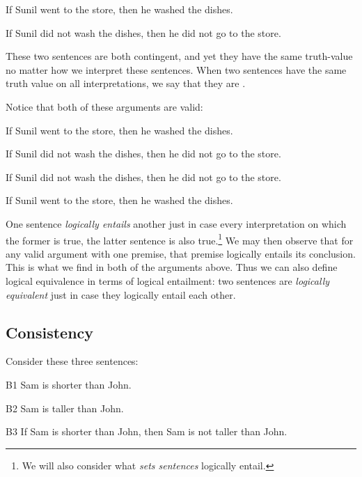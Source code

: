 \begin{earg}
  \item[] If Sunil went to the store, then he washed the dishes.
  \item[] If Sunil did not wash the dishes, then he did not go to the store.
\end{earg}

These two sentences are both contingent, and yet they have the same truth-value no matter how we interpret these sentences.
When two sentences have the same truth value on all interpretations, we say that they are .

Notice that both of these arguments are valid:

\begin{earg}
  \item[] If Sunil went to the store, then he washed the dishes.
  \item[\therefore] If Sunil did not wash the dishes, then he did not go to the store.
\end{earg}

\begin{earg}
  \item[] If Sunil did not wash the dishes, then he did not go to the store.
  \item[\therefore] If Sunil went to the store, then he washed the dishes.
\end{earg}

One sentence \textit{logically entails} another just in case every interpretation on which the former is true, the latter sentence is also true.\footnote{We will also consider what \textit{sets sentences} logically entail.}
We may then observe that for any valid argument with one premise, that premise logically entails its conclusion.
This is what we find in both of the arguments above.
Thus we can also define logical equivalence in terms of logical entailment: two sentences are \textit{logically equivalent} just in case they logically entail each other.




\subsection{Consistency}

Consider these three sentences:

\begin{ekey}
\item[B1] Sam is shorter than John.
\item[B2] Sam is taller than John. 
\item[B3] If Sam is shorter than John, then Sam is not taller than John.
\end{ekey}

